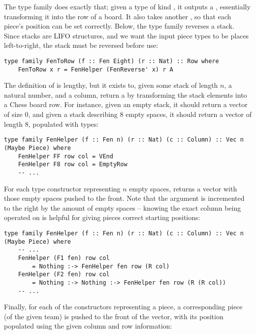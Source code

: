 The type family  does exactly that; given a type of kind , it outputs a , essentially transforming it into the row of a board. It also takes another , so that each piece's position can be set correctly. Below, the type family  reverses a  stack. Since stacks are LIFO structures, and we want the input piece types to be places left-to-right, the stack must be reversed before use:

\begin{lstlisting}
type family FenToRow (f :: Fen Eight) (r :: Nat) :: Row where
    FenToRow x r = FenHelper (FenReverse' x) r A
\end{lstlisting}

The definition of  is lengthy, but it exists to, given some  stack of length $n$, a natural number, and a column, return a  by transforming the stack elements into a Chess board row. For instance, given an empty stack, it should return a vector of size 0, and given a stack describing 8 empty spaces, it should return a vector of length 8, populated with  types:

\begin{lstlisting}
type family FenHelper (f :: Fen n) (r :: Nat) (c :: Column) :: Vec n (Maybe Piece) where
    FenHelper FF row col = VEnd
    FenHelper F8 row col = EmptyRow
    -- ...
\end{lstlisting}

For each type constructor representing $n$ empty spaces,  returns a vector with those empty spaces pushed to the front. Note that the  argument is incremented to the right by the amount of empty spaces -- knowing the exact column being operated on is helpful for giving pieces correct starting positions:

\begin{lstlisting}
type family FenHelper (f :: Fen n) (r :: Nat) (c :: Column) :: Vec n (Maybe Piece) where
    -- ...
    FenHelper (F1 fen) row col
        = Nothing :-> FenHelper fen row (R col)
    FenHelper (F2 fen) row col
        = Nothing :-> Nothing :-> FenHelper fen row (R (R col))
    -- ...
\end{lstlisting}

Finally, for each of the constructors representing a piece, a corresponding piece (of the given team) is pushed to the front of the vector, with its position populated using the given column and row information:

